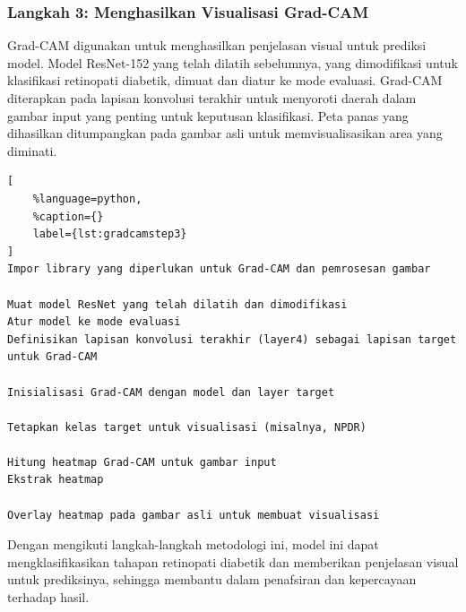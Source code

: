 %
%
%

\subsubsection{Langkah 3: Menghasilkan Visualisasi Grad-CAM}
Grad-CAM digunakan untuk menghasilkan penjelasan visual untuk prediksi model. Model ResNet-152 yang telah dilatih sebelumnya, yang dimodifikasi untuk klasifikasi retinopati diabetik, dimuat dan diatur ke mode evaluasi. Grad-CAM diterapkan pada lapisan konvolusi terakhir untuk menyoroti daerah dalam gambar input yang penting untuk keputusan klasifikasi. Peta panas yang dihasilkan ditumpangkan pada gambar asli untuk memvisualisasikan area yang diminati.
\begin{lstlisting}[
	%language=python,
	%caption={}
	label={lst:gradcamstep3}
]
Impor library yang diperlukan untuk Grad-CAM dan pemrosesan gambar

Muat model ResNet yang telah dilatih dan dimodifikasi
Atur model ke mode evaluasi
Definisikan lapisan konvolusi terakhir (layer4) sebagai lapisan target untuk Grad-CAM

Inisialisasi Grad-CAM dengan model dan layer target

Tetapkan kelas target untuk visualisasi (misalnya, NPDR)

Hitung heatmap Grad-CAM untuk gambar input
Ekstrak heatmap

Overlay heatmap pada gambar asli untuk membuat visualisasi

\end{lstlisting}
%
%
%
Dengan mengikuti langkah-langkah metodologi ini, model ini dapat mengklasifikasikan tahapan retinopati diabetik dan memberikan penjelasan visual untuk prediksinya, sehingga membantu dalam penafsiran dan kepercayaan terhadap hasil.